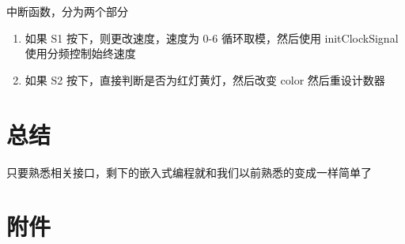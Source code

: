 \documentclass[a4paper,10pt,UTF8]{paper}
\numberwithin{equation}{section}
\numberwithin{figure}{section}
\begin{document}
中断函数，分为两个部分

\begin{enumerate}
  \item 如果 S1 按下，则更改速度，速度为 0-6 循环取模，然后使用 initClockSignal 使用分频控制始终速度
  \item 如果 S2 按下，直接判断是否为红灯黄灯，然后改变 color 然后重设计数器
\end{enumerate}

\section{总结}

只要熟悉相关接口，剩下的嵌入式编程就和我们以前熟悉的变成一样简单了


\section{附件}
\end{document}
